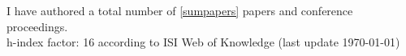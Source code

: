 \begin{publications}
I have authored a total number of \ref{sumpapers} papers and
conference proceedings. \\
h-index factor: 16 according to ISI Web of Knowledge (last update \today)

\end{publications}
